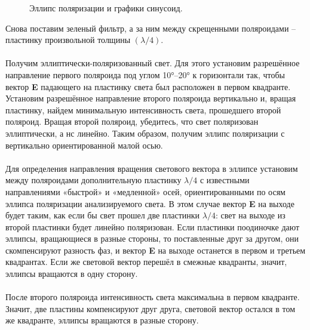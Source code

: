 \documentclass[a4paper,12pt]{article} %
\begin{document}
\begin{figure}[H]
	\caption{\centering Эллипс поляризации и графики синусоид.}
	\label{pic:5}
\end{figure}
Снова поставим зеленый фильтр, а за ним между скрещенными поляроидами -- пластинку произвольной толщины $( \lambda / 4 )$.
\\\\
Получим эллиптически-поляризованный свет. Для этого установим разрешённое направление первого поляроида под углом 10°--20° к горизонтали так, чтобы вектор \textbf{E} падающего на пластинку света был расположен в первом квадранте. Установим разрешённое направление второго поляроида вертикально и, вращая пластинку, найдем минимальную интенсивность света, прошедшего второй поляроид. Вращая второй поляроид, убедитесь, что свет поляризован эллиптически, а нс линейно. Таким образом, получим эллипс поляризации с вертикально ориентированной малой осью.
\\\\
Для определения направления вращения светового вектора в эллипсе установим между поляроидами дополнительную пластинку $ \lambda / 4 $ с известными направлениями «быстрой» и «медленной» осей, ориентированными по осям эллипса поляризации анализируемого света. В этом случае вектор \textbf{E} на выходе будет таким, как если бы свет прошел две пластинки $ \lambda / 4 $: свет на выходе из второй пластинки будет линейно поляризован. Если пластинки поодиночке дают эллипсы, вращающиеся в разные стороны, то поставленные друг за другом, они скомпенсируют разность фаз, и вектор \textbf{E} на выходе останется в первом и третьем квадрантах. Если же световой вектор перешёл в смежные квадранты, значит, эллипсы вращаются в одну сторону.
\\\\
После второго поляроида интенсивность света максимальна в первом квадранте. Значит, две пластины компенсируют друг друга, световой вектор остался в том же квадранте, эллипсы вращаются в разные сторону.
\end{document}
